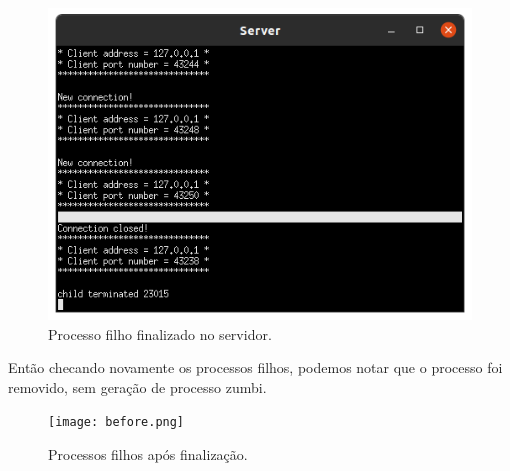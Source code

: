 \documentclass[12pt,a4paper]{report}
\begin{document}
\begin{figure}[H]
  \includegraphics[width=\linewidth]{pa.png}
  \caption{Processo filho finalizado no servidor.}
\end{figure}


Então checando novamente os processos filhos, podemos notar que o processo foi removido, sem geração de processo zumbi.
\begin{figure}[H]
  \texttt{[image: before.png]}
  \caption{Processos filhos após finalização.}
\end{figure}





\end{document}
